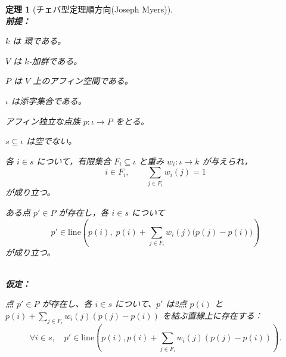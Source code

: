 \documentclass[a4paper,12pt]{bxjsbook}
\theoremstyle{theorem}
\newtheorem{theorem}{定理}[chapter]
\begin{document}
    \begin{theorem}[チェバ型定理順方向(Joseph Myers)]
        \noindent\textbf{\\前提：}\par
        \begin{theoremenumerate}[label=(P\arabic*), leftmargin=4em, topsep=2pt, partopsep=0pt, itemsep=0pt, parsep=0pt]
            \item $k$ は 環である。
            \item $V$ は $k$-加群である。
            \item $P$ は $V$ 上のアフィン空間である。
            \item $\iota$ は添字集合である。
            \item アフィン独立な点族 $p : \iota \to P$ をとる。
            \item $s \subseteq \iota$ は空でない。
            \item 各 $i\in s$ について，有限集合 $F_i\subseteq \iota$ と重み $w_i:\iota\to k$ が与えられ，
            \[
            i\in F_i,\qquad \sum_{j\in F_i} w_i(j)=1
            \]
            が成り立つ。
            \item ある点 $p'\in P$ が存在し，各 $i\in s$ について
            \[
            p' \in \mathrm{line}\!\left(
            p(i),\;
            p(i)+\sum_{j\in F_i} w_i(j)\bigl(p(j)-p(i)\bigr)
            \right)
            \]
            が成り立つ。
        \end{theoremenumerate}
        \noindent\textbf{\\仮定：}\par
        \begin{theoremenumerate}[label=(A\arabic*), leftmargin=4em, topsep=2pt, partopsep=0pt, itemsep=0pt, parsep=0pt]
            \item 点 $p' \in P$ が存在し、各 $i \in s$ について、$p'$ は2点 $p(i)$ と $p(i) + \sum_{j \in F_i} w_i(j)(p(j) - p(i))$ を結ぶ直線上に存在する：
            \[
            \forall i \in s, \quad p' \in \mathrm{line}\left(p(i), p(i) + \sum_{j \in F_i} w_i(j)(p(j) - p(i))\right).
            \]
        \end{theoremenumerate}


\end{theorem}
\end{document}
